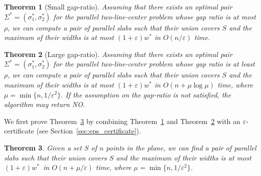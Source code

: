 \documentclass[10pt,a4paper]{article}
\newtheorem{theorem}{Theorem}
\theoremstyle{star}
\theoremstyle{claimstar}
\newcommand{\eps}{\ensuremath{\varepsilon}}
\begin{document}
\begin{theorem}[Small gap-ratio]
    \label{thm:small_gap_ratio}
    Assuming that there exists an optimal pair $\Sigma^* = (\sigma_1^*, \sigma_2^*)$ for the parallel two-line-center problem whose gap ratio is at most $\rho$, 
    we can compute a pair of parallel slabs such that their union covers $S$ and the maximum of their widths is at most $(1+\eps)w^*$ in $O(n/\eps)$ time. 
\end{theorem}

\begin{theorem}[Large gap-ratio]
    \label{thm:large_gap_ratio}
    Assuming that there exists an optimal pair $\Sigma^* = (\sigma_1^*, \sigma_2^*)$ for the parallel two-line-center problem whose gap ratio is at least $\rho$, 
    we can compute a pair of parallel slabs such that their union covers $S$ and the maximum of their widths is at most $(1+\eps)w^*$ in $O(n+ \mu\log \mu)$ time, where $\mu = \min \{n, 1/\eps^2\}$. 
    If the assumption on the gap-ratio is not satisfied, the algorithm may return NO.
\end{theorem}





We first prove  Theorem~\ref{thm:parallel} by combining Theorem~\ref{thm:small_gap_ratio} and Theorem~\ref{thm:large_gap_ratio} with an $\eps$-certificate (see Section~\ref{sec:eps_certificate}).  



\begin{theorem}
    \label{thm:parallel}
    Given a set $S$ of $n$ points in the plane, we can find a pair of parallel slabs such that their union covers $S$ and the maximum of their widths is at most $(1+\eps)w^*$~in $O(n + \mu /\eps)$ time, where $\mu = \min \{n, 1/\eps^2\}$.  
\end{theorem}
\end{document}
